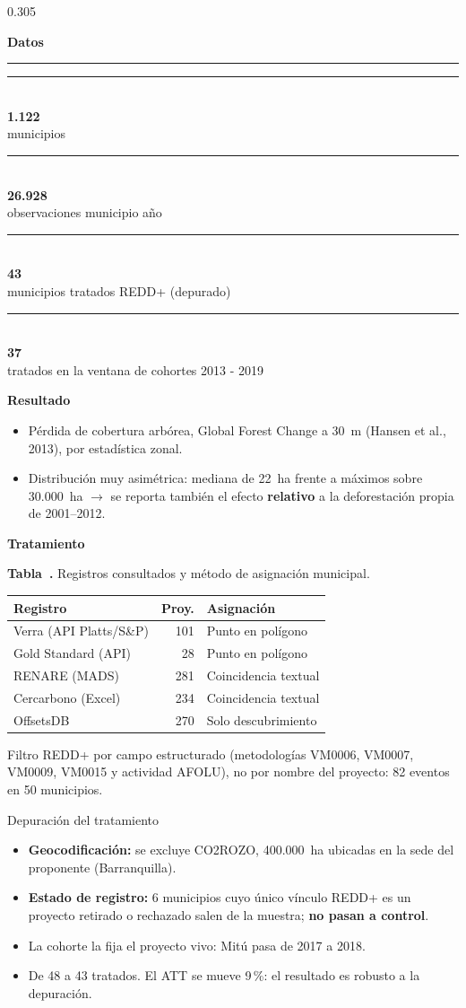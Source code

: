 \documentclass[final,t]{beamer}
\newcommand{\seccion}[2]{%
  \par\vspace{0.5\baselineskip}%
  {\color{dosel}\Large\bfseries #1\hfill{\color{tenue}\normalsize\mdseries #2}}\par
  \vspace{-0.35\baselineskip}%
  {\color{dosel}\rule{\linewidth}{2.2pt}}\par
  \vspace{0.25\baselineskip}%
}
\newcommand{\nota}[1]{{\color{tenue}\small #1\par}}
\newcounter{tabposter}
\newcommand{\tabcap}[2]{\refstepcounter{tabposter}\label{#1}%
  \nota{\textbf{Tabla~\thetabposter.} #2}}
\newcommand{\cifra}[2]{%
  \parbox[t]{0.46\linewidth}{%
    {\color{tinta}\rule{\linewidth}{2.5pt}}\\[0.25\baselineskip]
    {\color{dosel}\fontsize{42}{43}\selectfont\bfseries #1}\\[0.2\baselineskip]
    {\color{tenue}\small #2}}%
}
\begin{document}
\begin{frame}[t]{}
\begin{columns}[t]
\begin{column}{0.305\paperwidth}
\seccion{Datos}{}
\cifra{1.122}{municipios}\hfill\cifra{26.928}{observaciones municipio año}

\vspace{0.416cm}
\cifra{43}{municipios tratados REDD+ (depurado)}\hfill\cifra{37}{tratados en la ventana de cohortes 2013 - 2019}

\vspace{0.30cm}
\textbf{\large Resultado}
\begin{itemize}
  \item Pérdida de cobertura arbórea, Global Forest Change a 30~m (Hansen et al., 2013),
        por estadística zonal.
  \item Distribución muy asimétrica: mediana de 22~ha frente a máximos sobre 30.000~ha
        $\rightarrow$ se reporta también el efecto \textbf{relativo} a la deforestación
        propia de 2001--2012.
\end{itemize}

\textbf{\large Tratamiento}
\tabcap{tab:registros}{Registros consultados y método de asignación municipal.}
\begin{center}
\begin{tabularx}{\linewidth}{Xrl}
\toprule
\rowcolor{dosel}
\textcolor{papel}{\textbf{Registro}} & \textcolor{papel}{\textbf{Proy.}} &
\textcolor{papel}{\textbf{Asignación}}\\
\midrule
Verra (API Platts/S\&P) & 101 & Punto en polígono\\
Gold Standard (API)     & 28  & Punto en polígono\\
RENARE (MADS)           & 281 & Coincidencia textual\\
Cercarbono (Excel)      & 234 & Coincidencia textual\\
OffsetsDB               & 270 & Solo descubrimiento\\
\bottomrule
\end{tabularx}
\end{center}
\nota{Filtro REDD+ por campo estructurado (metodologías VM0006, VM0007, VM0009, VM0015 y actividad
AFOLU), no por nombre del proyecto: 82 eventos en 50 municipios.}

\begin{caja}{Depuración del tratamiento}
\begin{itemize}
  \item \textbf{Geocodificación:} se excluye CO2ROZO, 400.000~ha ubicadas en la sede del proponente
        (Barranquilla).
  \item \textbf{Estado de registro:} 6 municipios cuyo único vínculo REDD+ es un proyecto
        retirado o rechazado salen de la muestra; \textbf{no pasan a control}.
  \item La cohorte la fija el proyecto vivo: Mitú pasa de 2017 a 2018.
  \item[\textcolor{amazonia}{\rule{0.45ex}{0.45ex}}] De 48 a 43 tratados. El ATT se mueve 9\,\%:
        el resultado es robusto a la depuración.
\end{itemize}
\end{caja}


\end{column}
\end{columns}
\end{frame}
\end{document}
